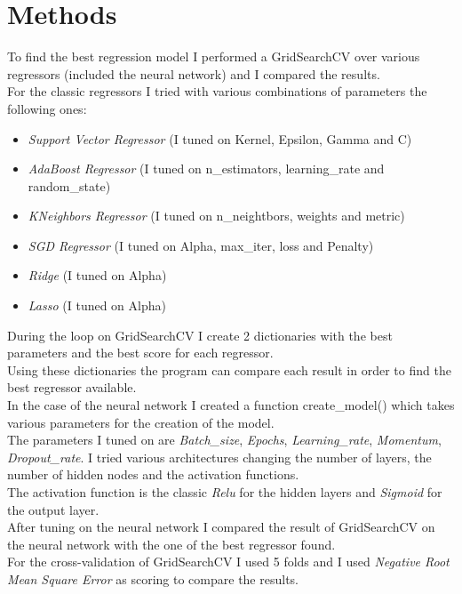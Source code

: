 \documentclass[a4paper,10pt]{report}
\begin{document}
\chapter{Methods}
To find the best regression model I performed a {\selectfont GridSearchCV} over various regressors (included the neural network) and I compared the results.\\
For the classic regressors I tried with various combinations of parameters the following ones:
\begin{itemize}
\item \emph{Support Vector Regressor} (I tuned on Kernel, Epsilon, Gamma and C)
\item \emph{AdaBoost Regressor} (I tuned on n\_estimators, learning\_rate and random\_state)
\item \emph{KNeighbors Regressor} (I tuned on n\_neightbors, weights and metric)
\item \emph{SGD Regressor} (I tuned on Alpha, max\_iter, loss and Penalty)
\item \emph{Ridge} (I tuned on Alpha)
\item \emph{Lasso} (I tuned on Alpha)
\end{itemize}
During the loop on {\selectfont GridSearchCV} I create 2 dictionaries with the best parameters and the best score for each regressor.\\
Using these dictionaries the program can compare each result in order to find the best regressor available.\\
In the case of the neural network I created a function {\selectfont create\_model()} which takes various parameters for the creation of the model.\\
The parameters I tuned on are \emph{Batch\_size}, \emph{Epochs}, \emph{Learning\_rate}, \emph{Momentum}, \emph{Dropout\_rate}.
I tried various architectures changing the number of layers, the number of hidden nodes and the activation functions.\\
The activation function is the classic \emph{Relu} for the hidden layers and \emph{Sigmoid} for the output layer.\\
After tuning on the neural network I compared the result of {\selectfont GridSearchCV} on the neural network with the one of the best regressor found.\\
For the cross-validation of {\selectfont GridSearchCV} I used 5 folds and I used \emph{Negative Root Mean Square Error} as scoring to compare the results.
\end{document}
